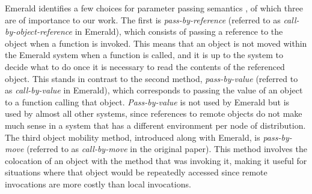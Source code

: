 Emerald identifies a few choices for parameter passing semantics \cite{JulEric1988Fmit}, of which three are of importance to our work. The first is \textit{pass-by-reference} (referred to as \textit{call-by-object-reference} in Emerald), which consists of passing a reference to the object when a function is invoked. This means that an object is not moved within the Emerald system when a function is called, and it is up to the system to decide what to do once it is necessary to read the contents of the referenced object. This stands in contrast to the second method, \textit{pass-by-value} (referred to as \textit{call-by-value} in Emerald), which corresponds to passing the value of an object to a function calling that object. \textit{Pass-by-value} is not used by Emerald but is used by almost all other systems, since references to remote objects do not make much sense in a system that has a different environment per node of distribution. The third object mobility method, introduced along with Emerald, is \textit{pass-by-move} (referred to as \textit{call-by-move} in the original paper). This method involves the colocation of an object with the method that was invoking it, making it useful for situations where that object would be repeatedly accessed since remote invocations are more costly than local invocations. 